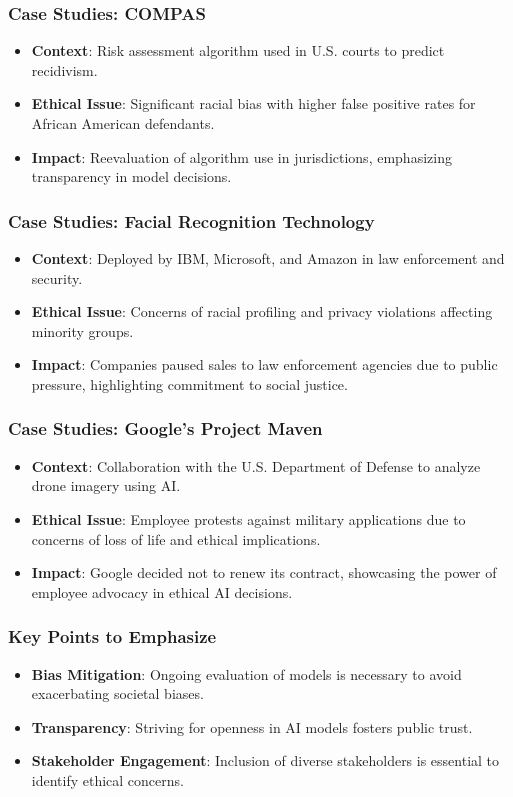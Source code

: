 \documentclass[aspectratio=169]{beamer}
\begin{document}
\begin{frame}[fragile]
    \frametitle{Case Studies: COMPAS}
    \begin{itemize}
        \item \textbf{Context}: Risk assessment algorithm used in U.S. courts to predict recidivism.
        \item \textbf{Ethical Issue}: Significant racial bias with higher false positive rates for African American defendants.
        \item \textbf{Impact}: Reevaluation of algorithm use in jurisdictions, emphasizing transparency in model decisions.
    \end{itemize}
\end{frame}

\begin{frame}[fragile]
    \frametitle{Case Studies: Facial Recognition Technology}
    \begin{itemize}
        \item \textbf{Context}: Deployed by IBM, Microsoft, and Amazon in law enforcement and security.
        \item \textbf{Ethical Issue}: Concerns of racial profiling and privacy violations affecting minority groups.
        \item \textbf{Impact}: Companies paused sales to law enforcement agencies due to public pressure, highlighting commitment to social justice.
    \end{itemize}
\end{frame}

\begin{frame}[fragile]
    \frametitle{Case Studies: Google’s Project Maven}
    \begin{itemize}
        \item \textbf{Context}: Collaboration with the U.S. Department of Defense to analyze drone imagery using AI.
        \item \textbf{Ethical Issue}: Employee protests against military applications due to concerns of loss of life and ethical implications.
        \item \textbf{Impact}: Google decided not to renew its contract, showcasing the power of employee advocacy in ethical AI decisions.
    \end{itemize}
\end{frame}

\begin{frame}[fragile]
    \frametitle{Key Points to Emphasize}
    \begin{itemize}
        \item \textbf{Bias Mitigation}: Ongoing evaluation of models is necessary to avoid exacerbating societal biases.
        \item \textbf{Transparency}: Striving for openness in AI models fosters public trust.
        \item \textbf{Stakeholder Engagement}: Inclusion of diverse stakeholders is essential to identify ethical concerns.
    \end{itemize}
\end{frame}
\end{document}
